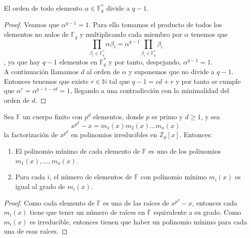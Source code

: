 \begin{teorema}
	El orden de todo elemento $\alpha \in \mathbb{F}^*_q$ divide a $q-1$. 
\end{teorema}
\begin{proof}
		Veamos que $\alpha^{q-1}=1$. Para ello tomamos el producto de todos los elementos no nulos de $\mathbb{F}_q$ y multiplicando cada miembro por $\alpha$ tenemos que \[ \prod_{\beta_i \in \mathbb{F}^*_q}\alpha\beta_i=\alpha^{q-1}\prod_{\beta_i \in \mathbb{F}^*_q}\beta_i\],
		ya que hay $q-1$ elementos en $\mathbb{F}^*_q$ y por tanto, despejando, $\alpha^{q-1}=1$.\\
		A continuación llamamos $d$ al orden de $\alpha$ y suponemos que no divide a $q-1$. Entonces tenemos que existe $r\in\mathbb{N}$ tal que $q-1=cd+r$ y por tanto se cumple que $\alpha^r=\alpha^{q-1-cd}=1$, llegando a una contradicción con la minimalidad del orden de $d$.
\end{proof}

\begin{proposicion}
	Sea $\mathbb{F}$ un cuerpo finito con $p^d$ elementos, donde $p$ es primo y $d\geq 1$, y sea
	$$
		x^{p^d}-x=m_1(x)m_2(x)\dots m_n(x)
	$$
	la factorización  de $x^{p^d}$ en polinomios irreducibles en $\mathbb{Z}_p[x]$. Entonces:
	\begin{enumerate}
		\item El polinomio mínimo de cada elemento de $\mathbb{F}$ es uno de los polinomios $m_1(x),\dots,m_n(x)$.
		\item Para cada $i$, el número de elementos de $\mathbb{F}$ con polinomio mínimo $m_i(x)$ es igual al grado de $m_i(x)$.
	\end{enumerate}
\end{proposicion}

\begin{proof}
		Como cada elemento de $\mathbb{F}$ es una de las raíces de $x^{p^d}-x$, entonces cada $m_i(x)$ tiene que tener un número de raíces en $\mathbb{F}$ equivalente a su grado. Como $m_i(x)$ es irreducible, entonces tienen que haber un polinomio mínimo para cada una de esas raíces.
\end{proof}

